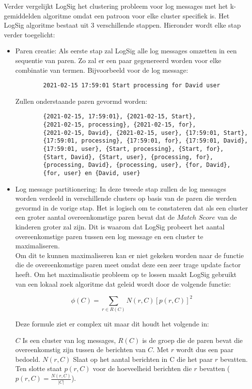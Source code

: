 Verder vergelijkt LogSig het clustering probleem voor log messages met het k-gemiddelden algoritme omdat een patroon voor elke cluster specifiek is. Het LogSig algoritme bestaat uit 3 verschillende stappen. Hieronder wordt elke stap verder toegelicht:
\begin{itemize}
    \item Paren creatie: Als eerste stap zal LogSig alle log messages omzetten in een sequentie van paren. Zo zal er een paar gegenereerd worden voor elke combinatie van termen. Bijvoorbeeld voor de log message:
    \begin{verbatim}
        2021-02-15 17:59:01 Start processing for David user
    \end{verbatim}
    Zullen onderstaande paren gevormd worden:
    \begin{verbatim}
        {2021-02-15, 17:59:01}, {2021-02-15, Start}, 
        {2021-02-15, processing}, {2021-02-15, for}, 
        {2021-02-15, David}, {2021-02-15, user}, {17:59:01, Start}, 
        {17:59:01, processing}, {17:59:01, for}, {17:59:01, David}, 
        {17:59:01, user}, {Start, processing}, {Start, for},
        {Start, David}, {Start, user}, {processing, for},
        {processing, David}, {processing, user}, {for, David},
        {for, user} en {David, user}
    \end{verbatim}
    
    \item Log message partitionering: In deze tweede stap zullen de log messages worden verdeeld in verschillende clusters op basis van de paren die werden gevormd in de vorige stap. Het is logisch om te constateren dat als een cluster een groter aantal overeenkomstige paren bevat dat de $Match$ $Score$ van de kinderen groter zal zijn. Dit is waarom dat LogSig probeert het aantal overeenkomstige paren tussen een log message en een cluster te maximaliseren.\\
    Om dit te kunnen maximaliseren kan er niet gekeken worden naar de functie die de overeenkomstige paren meet omdat deze een zeer trage update factor heeft. Om het maximalisatie probleem op te lossen maakt LogSig gebruikt van een lokaal zoek algoritme dat geleid wordt door de volgende functie:
    
    \[\phi(C) = \sum_{r \in R(C)} N(r, C)[p(r, C)]^2\]
    
    Deze formule ziet er complex uit maar dit houdt het volgende in:
    
    \subitem $C$ Is een cluster van log messages, $R(C)$ is de groep die de paren bevat die overeenkomstig zijn tussen de berichten van $C$. Met $r$ wordt dus een paar bedoeld. $N(r,C)$ Slaat op het aantal berichten in C die het paar $r$ bevatten. Ten slotte staat $p(r,C)$ voor de hoeveelheid berichten die $r$ bevatten (\(p(r,C) = \frac{N(r,C)}{\lvert C \rvert}\)).
    

\end{itemize}
